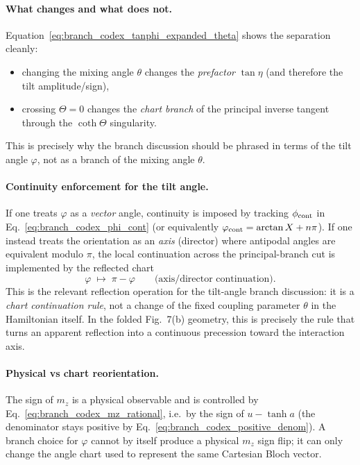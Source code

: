 \paragraph{What changes and what does not.}
Equation~\eqref{eq:branch_codex_tanphi_expanded_theta} shows the separation
cleanly:
\begin{itemize}
    \item changing the mixing angle $\theta$ changes the \emph{prefactor}
    $\tan\eta$ (and therefore the tilt amplitude/sign),
    \item crossing $\Theta=0$ changes the \emph{chart branch} of the principal
    inverse tangent through the $\coth\Theta$ singularity.
\end{itemize}
This is precisely why the branch discussion should be phrased in terms of the
tilt angle $\varphi$, not as a branch of the mixing angle $\theta$.

\paragraph{Continuity enforcement for the tilt angle.}
If one treats $\varphi$ as a \emph{vector} angle, continuity is imposed by
tracking $\phi_{\rm cont}$ in Eq.~\eqref{eq:branch_codex_phi_cont} (or
equivalently $\varphi_{\rm cont}=\arctan X+n\pi$).  If one instead treats the
orientation as an \emph{axis} (director) where antipodal angles are equivalent
modulo $\pi$, the local continuation across the principal-branch cut is
implemented by the reflected chart
\begin{equation}
    \varphi \;\mapsto\; \pi-\varphi
    \qquad\text{(axis/director continuation)}.
    \label{eq:branch_codex_varphi_reflect}
\end{equation}
This is the relevant reflection operation for the tilt-angle branch discussion:
it is a \emph{chart continuation rule}, not a change of the fixed coupling
parameter $\theta$ in the Hamiltonian itself.  In the folded Fig.~7(b) geometry,
this is precisely the rule that turns an apparent reflection into a continuous
precession toward the interaction axis.

\paragraph{Physical vs chart reorientation.}
The sign of $m_z$ is a physical observable and is controlled by
Eq.~\eqref{eq:branch_codex_mz_rational}, i.e.\ by the sign of
$u-\tanh a$ (the denominator stays positive by
Eq.~\eqref{eq:branch_codex_positive_denom}).  A branch choice for $\varphi$
cannot by itself produce a physical $m_z$ sign flip; it can only change the
angle chart used to represent the same Cartesian Bloch vector.


